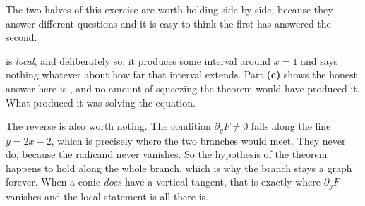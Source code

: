 \begin{exercisesolution}
\begin{remark}
\label{rem:implicit_local_versus_global}
The two halves of this exercise are worth holding side by side, because they answer different
questions and it is easy to think the first has answered the second.

 is \emph{local}, and deliberately so: it produces some
interval around $x=1$ and says nothing whatever about how far that interval extends. Part
\textbf{(c)} shows the honest answer here is , and no amount of squeezing
the theorem would have produced it. What produced it was solving the equation.

The reverse is also worth noting. The condition $\partial_yF \neq 0$ fails along the line
$y = 2x-2$, which is precisely where the two branches would meet. They never do, because the
radicand never vanishes. So the hypothesis of the theorem happens to hold along the whole
branch, which is why the branch stays a graph forever. When a conic \emph{does} have a vertical
tangent, that is exactly where $\partial_yF$ vanishes and the local statement is all there is.
\end{remark}
\end{exercisesolution}



